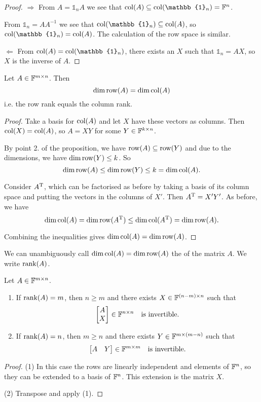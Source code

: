 \begin{proof}
$\boxed{\Rightarrow}$ From $A = \mathbb{1}_nA$ we see that $\Col(A)\subseteq\Col(\mathbb{1}_n) = \F^n$.

From $\mathbb{1}_n = AA^{-1}$ we see that $\Col(\mathbb{1}_n)\subseteq\Col(A)$, so $\Col(\mathbb{1}_n) = \Col(A)$. The calculation of the row space is similar.

$\boxed{\Leftarrow}$ From $\Col(A) = \Col(\mathbb{1}_n)$, there exists an $X$ such that $\mathbb{1}_n = AX$, so $X$ is the inverse of $A$.
\end{proof}
\begin{corollary}
Let $A\in\mathbb{F}^{m\times n}$. Then
\[ \dim\operatorname{row}(A) = \dim\operatorname{col}(A) \]
i.e. the row rank equals the column rank.
\end{corollary}
\begin{proof}
Take a basis for $\operatorname{col}(A)$ and let $X$ have these vectors as columns. Then $\operatorname{col}(X) = \operatorname{col}(A)$, so $A = XY$ for some $Y\in\mathbb{F}^{k\times n}$.

By point 2. of the proposition, we have $\operatorname{row}(A)\subseteq \operatorname{row}(Y)$ and due to the dimensions, we have $\dim\operatorname{row}(Y)\leq k$. So
\[ \dim\operatorname{row}(A) \leq \dim\operatorname{row}(Y) \leq k = \dim\operatorname{col}(A). \]

Consider $A^{\mathrm{T}}$, which can be factorised as before by taking a basis of its column space and putting the vectors in the columns of $X'$. Then $A^{\mathrm{T}} = X'Y'$. As before, we have
\[ \dim\operatorname{col}(A) = \dim\operatorname{row}(A^{\mathrm{T}}) \leq \dim\operatorname{col}(A^{\mathrm{T}}) = \dim\operatorname{row}(A). \]

Combining the inequalities gives $\dim\operatorname{col}(A) = \dim\operatorname{row}(A)$.
\end{proof}
\begin{definition}
We can unambiguously call $\dim\operatorname{col}(A)=\dim\operatorname{row}(A)$ the  of the matrix $A$. We write $\operatorname{rank}(A)$.
\end{definition}

\begin{lemma} \label{lemma:extendToInvertible}
Let $A\in\mathbb{F}^{m\times n}$.
\begin{enumerate}
\item If $\operatorname{rank}(A) = m$, then $n\geq m$ and there exists $X\in\mathbb{F}^{(n-m)\times n}$ such that
\[ \begin{bmatrix}
A \\ X
\end{bmatrix} \in \mathbb{F}^{n\times n} \quad \text{is invertible.} \]
\item If $\operatorname{rank}(A) = n$, then $m\geq n$ and there exists $Y\in\mathbb{F}^{m\times (m-n)}$ such that
\[ \begin{bmatrix}
A & Y
\end{bmatrix} \in \mathbb{F}^{m\times m} \quad \text{is invertible.} \]
\end{enumerate}
\end{lemma}
\begin{proof}
(1) In this case the rows are linearly independent and elements of $\mathbb{F}^n$, so they can be extended to a basis of $\mathbb{F}^n$. This extension is the matrix $X$.

(2) Transpose and apply (1).
\end{proof}


